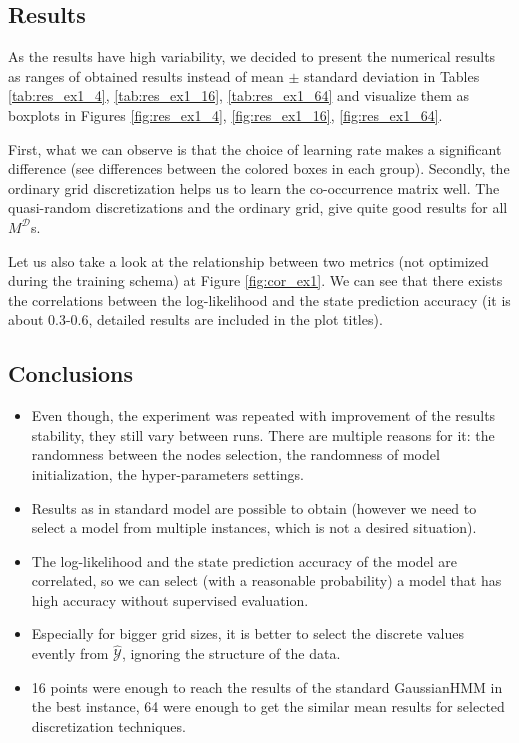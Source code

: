 \documentclass[shortabstract]{iithesis}
\begin{document}
\subsection{Results}

As the results have high variability, we decided to present the numerical results as ranges of obtained results instead of mean $\pm$ standard deviation in Tables \ref{tab:res_ex1_4}, \ref{tab:res_ex1_16}, \ref{tab:res_ex1_64} and visualize them as boxplots in Figures \ref{fig:res_ex1_4}, \ref{fig:res_ex1_16}, \ref{fig:res_ex1_64}. 

First, what we can observe is that the choice of learning rate makes a significant difference (see differences between the colored boxes in each group). Secondly, the ordinary grid discretization helps us to learn the co-occurrence matrix well. The quasi-random discretizations and the ordinary grid, give quite good results for all $M^{\mathcal D}$s. 

Let us also take a look at the relationship between two metrics (not optimized during the training schema) at Figure \ref{fig:cor_ex1}. We can see that there exists the correlations between the log-likelihood and the state prediction accuracy (it is about 0.3-0.6, detailed results are included in the plot titles).

\subsection{Conclusions}

\begin{itemize}
    \item Even though, the experiment was repeated with improvement of the results stability, they still vary between runs. There are multiple reasons for it: the randomness between the nodes selection, the randomness of model initialization, the hyper-parameters settings. 
    \item Results as in standard model are possible to obtain (however we need to select a model from multiple instances, which is not a desired situation).
    \item The log-likelihood and the state prediction accuracy of the model are correlated, so we can select (with a reasonable probability) a model that has high accuracy without supervised evaluation. 
    \item Especially for bigger grid sizes, it is better to select the discrete values evently from $\hat{\mathcal Y}$, ignoring the structure of the data.
    \item 16 points were enough to reach the results of the standard GaussianHMM in the best instance, 64 were enough to get the similar mean results for selected discretization techniques. 
\end{itemize}
\end{document}
